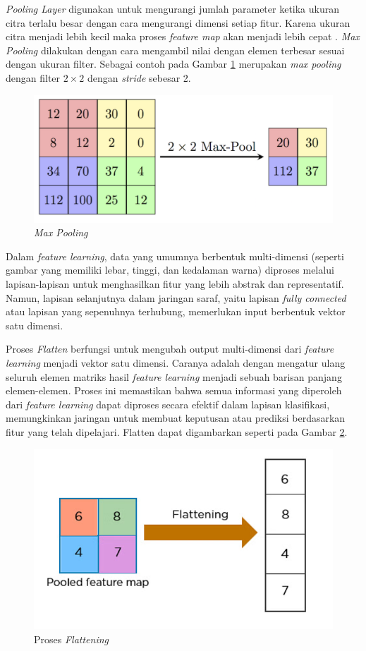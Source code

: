 \emph{Pooling Layer} digunakan untuk mengurangi jumlah parameter ketika ukuran citra terlalu besar dengan cara mengurangi dimensi setiap fitur. Karena ukuran citra menjadi lebih kecil maka proses \emph{feature map} akan menjadi lebih cepat \parencite{hakim2018penerapan}. \emph{Max Pooling} dilakukan dengan cara mengambil nilai dengan elemen terbesar sesuai dengan ukuran filter. Sebagai contoh pada Gambar \ref{fig:Max Pooling} merupakan \emph{max pooling} dengan filter \(2 \times 2\) dengan \emph{stride} sebesar 2.

\begin{figure} [ht] \centering
    \includegraphics[width=.6\textwidth]{gambar/pooling.png}
    \caption{\emph{Max Pooling}}
    \label{fig:Max Pooling}
\end{figure}

Dalam \textit{feature learning}, data yang umumnya berbentuk multi-dimensi (seperti gambar yang memiliki lebar, tinggi, dan kedalaman warna) diproses melalui lapisan-lapisan untuk menghasilkan fitur yang lebih abstrak dan representatif. Namun, lapisan selanjutnya dalam jaringan saraf, yaitu lapisan \textit{fully connected} atau lapisan yang sepenuhnya terhubung, memerlukan input berbentuk vektor satu dimensi.

Proses \textit{Flatten} berfungsi untuk mengubah output multi-dimensi dari \textit{feature learning} menjadi vektor satu dimensi. Caranya adalah dengan mengatur ulang seluruh elemen matriks hasil \textit{feature learning} menjadi sebuah barisan panjang elemen-elemen. Proses ini memastikan bahwa semua informasi yang diperoleh dari \textit{feature learning} dapat diproses secara efektif dalam lapisan klasifikasi, memungkinkan jaringan untuk membuat keputusan atau prediksi berdasarkan fitur yang telah dipelajari. Flatten dapat digambarkan seperti pada Gambar \ref{fig:Proses Flattening}.

\begin{figure} [ht] \centering
    \includegraphics[width=.6\textwidth]{gambar/flatten.png}
    \caption{Proses \emph{Flattening}}
    \label{fig:Proses Flattening}
\end{figure}

